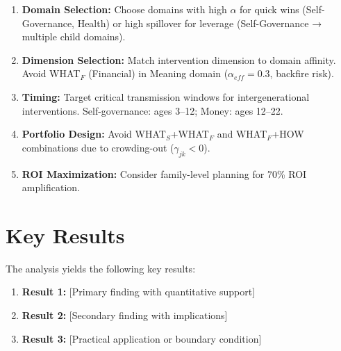 \begin{tcolorbox}[colback=green!5!white, colframe=green!75!black,
    title=Practical Implications]
\begin{enumerate}
\item \textbf{Domain Selection:} Choose domains with high $\alpha$ for quick wins (Self-Governance, Health) or high spillover for leverage (Self-Governance → multiple child domains).

\item \textbf{Dimension Selection:} Match intervention dimension to domain affinity. Avoid WHAT$_F$ (Financial) in Meaning domain ($\alpha_{eff} = 0.3$, backfire risk).

\item \textbf{Timing:} Target critical transmission windows for intergenerational interventions. Self-governance: ages 3--12; Money: ages 12--22.

\item \textbf{Portfolio Design:} Avoid WHAT$_S$+WHAT$_F$ and WHAT$_F$+HOW combinations due to crowding-out ($\gamma_{jk} < 0$).

\item \textbf{ROI Maximization:} Consider family-level planning for 70\% ROI amplification.
\end{enumerate}
\end{tcolorbox}




\section{Key Results}
\label{sec:method-calc-results}

The analysis yields the following key results:

\begin{enumerate}
    \item \textbf{Result 1:} [Primary finding with quantitative support]
    \item \textbf{Result 2:} [Secondary finding with implications]
    \item \textbf{Result 3:} [Practical application or boundary condition]
\end{enumerate}


